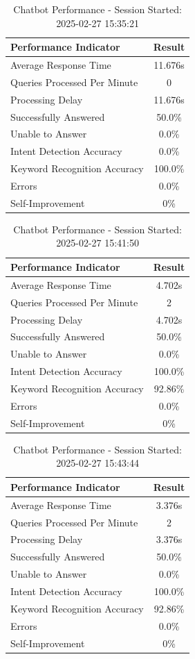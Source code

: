 \begin{table}[h!]
\centering
\caption{Chatbot Performance - Session Started: 2025-02-27 15:35:21}
\begin{tabular}{|l|c|}
\hline
\textbf{Performance Indicator} & \textbf{Result} \\
\hline
Average Response Time & 11.676s \\
Queries Processed Per Minute & 0 \\
Processing Delay & 11.676s \\
Successfully Answered & 50.0\% \\
Unable to Answer & 0.0\% \\
Intent Detection Accuracy & 0.0\% \\
Keyword Recognition Accuracy & 100.0\% \\
Errors & 0.0\% \\
Self-Improvement & 0\% \\
\hline
\end{tabular}
\end{table}

\begin{table}[h!]
\centering
\caption{Chatbot Performance - Session Started: 2025-02-27 15:41:50}
\begin{tabular}{|l|c|}
\hline
\textbf{Performance Indicator} & \textbf{Result} \\
\hline
Average Response Time & 4.702s \\
Queries Processed Per Minute & 2 \\
Processing Delay & 4.702s \\
Successfully Answered & 50.0\% \\
Unable to Answer & 0.0\% \\
Intent Detection Accuracy & 100.0\% \\
Keyword Recognition Accuracy & 92.86\% \\
Errors & 0.0\% \\
Self-Improvement & 0\% \\
\hline
\end{tabular}
\end{table}

\begin{table}[h!]
\centering
\caption{Chatbot Performance - Session Started: 2025-02-27 15:43:44}
\begin{tabular}{|l|c|}
\hline
\textbf{Performance Indicator} & \textbf{Result} \\
\hline
Average Response Time & 3.376s \\
Queries Processed Per Minute & 2 \\
Processing Delay & 3.376s \\
Successfully Answered & 50.0\% \\
Unable to Answer & 0.0\% \\
Intent Detection Accuracy & 100.0\% \\
Keyword Recognition Accuracy & 92.86\% \\
Errors & 0.0\% \\
Self-Improvement & 0\% \\
\hline
\end{tabular}
\end{table}

